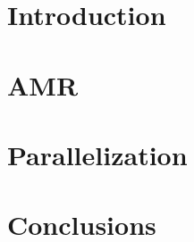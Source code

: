 \documentclass{beamer}
\author{James Bordner}
\date{June 28, 2010}
\begin{document}



\section{Introduction}
  
\section{AMR}
  
\section{Parallelization}
  
\section{Conclusions}
  
\end{document}
